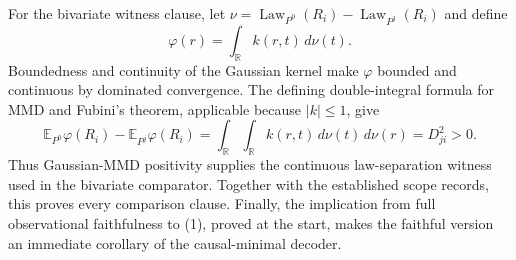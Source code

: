 For the bivariate witness clause, let \(\nu=\operatorname{Law}_{P^0}(R_i)-\operatorname{Law}_{P^j}(R_i)\) and define
\[
 \varphi(r)=\int_{\mathbb R}k(r,t)\,d\nu(t).
\tag{29}
\]
Boundedness and continuity of the Gaussian kernel make \(\varphi\) bounded and continuous by dominated convergence.  The defining double-integral formula for MMD and Fubini's theorem, applicable because \(|k|\le1\), give
\[
 \mathbb E_{P^0}\varphi(R_i)-\mathbb E_{P^j}\varphi(R_i)
 =\int_{\mathbb R}\!\int_{\mathbb R}k(r,t)\,d\nu(t)\,d\nu(r)
 =D_{ji}^{2}>0.
\tag{30}
\]
Thus Gaussian-MMD positivity supplies the continuous law-separation witness used in the bivariate comparator.  Together with the established scope records, this proves every comparison clause.  Finally, the implication from full observational faithfulness to (1), proved at the start, makes the faithful version an immediate corollary of the causal-minimal decoder.
